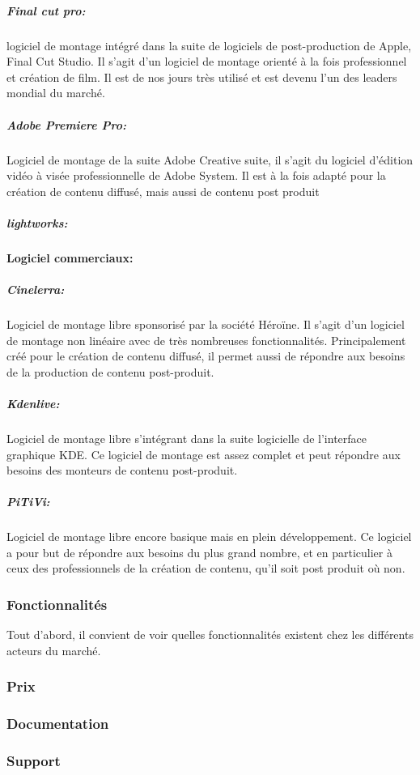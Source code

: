 \subparagraph{Final cut pro:}
logiciel de montage intégré dans la suite de logiciels de post-production
de Apple, Final Cut Studio. Il s'agit d'un logiciel de montage orienté à la fois
professionnel et création de film. Il est de nos jours très utilisé et est devenu l'un
des leaders mondial du marché.

\subparagraph{Adobe Premiere Pro:}
Logiciel de montage de la suite Adobe Creative suite, il s'agit du logiciel
d'édition vidéo à visée professionnelle de Adobe System. Il est à la fois adapté pour la création
de contenu diffusé, mais aussi de contenu post produit

\subparagraph{lightworks:}


\paragraph {Logiciel commerciaux:}

\subparagraph{Cinelerra:}
Logiciel de montage libre sponsorisé par la société Héroïne. Il s'agit d'un logiciel
de montage non linéaire avec de très nombreuses fonctionnalités. Principalement créé pour le création de contenu
diffusé, il permet aussi de répondre aux besoins de la production de contenu post-produit.

\subparagraph{Kdenlive:}
Logiciel de montage libre s'intégrant dans la suite logicielle de l'interface graphique KDE.
Ce logiciel de montage est assez complet et peut répondre aux besoins des monteurs de contenu post-produit.

\subparagraph{PiTiVi:}
Logiciel de montage libre encore basique mais en plein développement.
Ce logiciel a pour but de répondre aux besoins du plus grand nombre,
et en particulier à ceux des professionnels de la création de contenu,
qu'il soit post produit où non.


\subsubsection{Fonctionnalités}
  Tout d'abord, il convient de voir quelles fonctionnalités existent chez les différents
  acteurs du marché.
  \subsubsection{Prix}
  \subsubsection{Documentation}
  \subsubsection{Support}
